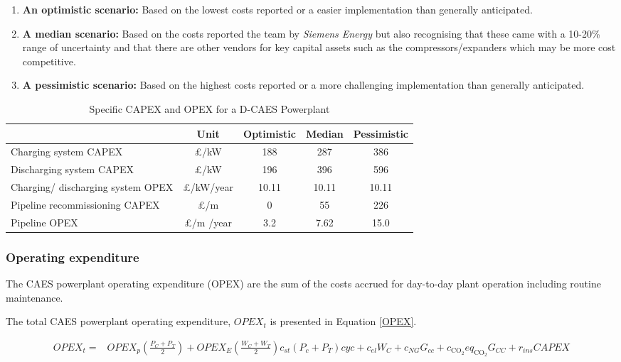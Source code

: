 \documentclass[preprint,12pt]{elsarticle}
\begin{document}
\begin{enumerate}
  \item \textbf{An optimistic scenario:} Based on the lowest costs reported or a easier implementation than generally anticipated.
  \item \textbf{A median scenario:} Based on the costs reported the team by \textit{Siemens Energy} but also recognising that these came with a 10-20\% range of uncertainty and that there are other vendors for key capital assets such as the compressors/expanders which may be more cost competitive.
  \item \textbf{A pessimistic scenario:} Based on the highest costs reported or a more challenging implementation than generally anticipated.
\end{enumerate}

\begin{table}[h]
    \centering
    \begin{tabular}{p{3cm}cccc}
\hline
 & Unit & Optimistic & Median & Pessimistic \\ \hline
Charging system CAPEX & £/kW & 188 & 287 & 386 \\
Discharging system CAPEX & £/kW & 196 & 396 & 596 \\ 
Charging/ discharging system OPEX & £/kW/year & 10.11 & 10.11 & 10.11 \\
Pipeline recommissioning CAPEX & £/m & 0 & 55 & 226 \\
Pipeline OPEX & £/m /year& 3.2 & 7.62 & 15.0 \\
\hline

\end{tabular}
    \caption{Specific CAPEX and OPEX for a D-CAES Powerplant}
    \label{tab:specCAPEX}
\end{table}

\subsubsection{Operating expenditure}
The CAES powerplant operating expenditure (OPEX) are the sum of the costs accrued for day-to-day plant operation including routine maintenance.

The total CAES powerplant operating expenditure, $OPEX_t$ is presented in Equation \ref{OPEX}.

\begin{equation}
\begin{split}
        OPEX_t= & OPEX_p\left(\frac{P_C+P_T}{2}\right)+ OPEX_E\left(\frac{W_C+W_T}{2}\right) c_{st}\left(P_c+P_T\right) cyc +
        c_{el} W_C+{ c}_{NG} G_{cc} +c_{\mathrm{CO}_2} eq_{\mathrm{CO}_2} G_{CC}+ r_{ins} CAPEX 
    \label{OPEX}
\end{split}
\end{equation}
\end{document}
